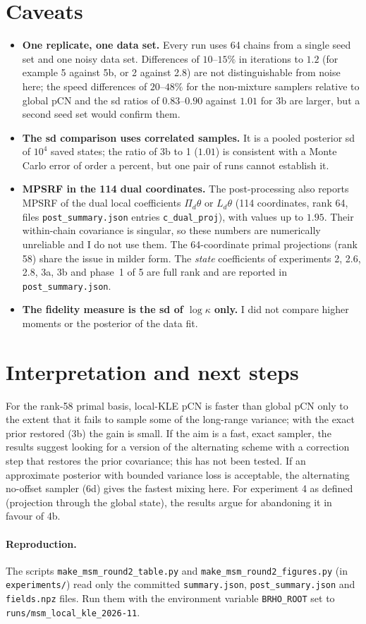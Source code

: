 \documentclass[11pt]{article}
\begin{document}
\section{Caveats}
\begin{itemize}
\item \textbf{One replicate, one data set.} Every run uses 64 chains from a single seed set and one noisy data set. Differences of $10$--$15\%$ in iterations to $1.2$ (for example 5 against 5b, or 2 against 2.8) are not distinguishable from noise here; the speed differences of $20$--$48\%$ for the non-mixture samplers relative to global pCN and the sd ratios of $0.83$--$0.90$ against $1.01$ for 3b are larger, but a second seed set would confirm them.
\item \textbf{The sd comparison uses correlated samples.} It is a pooled posterior sd of $10^4$ saved states; the ratio of 3b to 1 ($1.01$) is consistent with a Monte Carlo error of order a percent, but one pair of runs cannot establish it.
\item \textbf{MPSRF in the 114 dual coordinates.} The post-processing also reports MPSRF of the dual local coefficients $\Pi_d\theta$ or $L_d\theta$ (114 coordinates, rank 64, files \texttt{post\_summary.json} entries \texttt{c\_dual\_proj}), with values up to $1.95$. Their within-chain covariance is singular, so these numbers are numerically unreliable and I do not use them. The 64-coordinate primal projections (rank 58) share the issue in milder form. The \emph{state} coefficients of experiments 2, 2.6, 2.8, 3a, 3b and phase~1 of 5 are full rank and are reported in \texttt{post\_summary.json}.
\item \textbf{The fidelity measure is the sd of $\log\kappa$ only.} I did not compare higher moments or the posterior of the data fit.
\end{itemize}

\section{Interpretation and next steps}
For the rank-58 primal basis, local-KLE pCN is faster than global pCN only to the extent that it fails to sample some of the long-range variance; with the exact prior restored (3b) the gain is small. If the aim is a fast, exact sampler, the results suggest looking for a version of the alternating scheme with a correction step that restores the prior covariance; this has not been tested. If an approximate posterior with bounded variance loss is acceptable, the alternating no-offset sampler (6d) gives the fastest mixing here. For experiment 4 as defined (projection through the global state), the results argue for abandoning it in favour of 4b.

\paragraph{Reproduction.} The scripts \texttt{make\_msm\_round2\_table.py} and \texttt{make\_msm\_round2\_figures.py} (in \texttt{experiments/}) read only the committed \texttt{summary.json}, \texttt{post\_summary.json} and \texttt{fields.npz} files. Run them with the environment variable \texttt{BRHO\_ROOT} set to \texttt{runs/msm\_local\_kle\_2026-11}.
\end{document}
